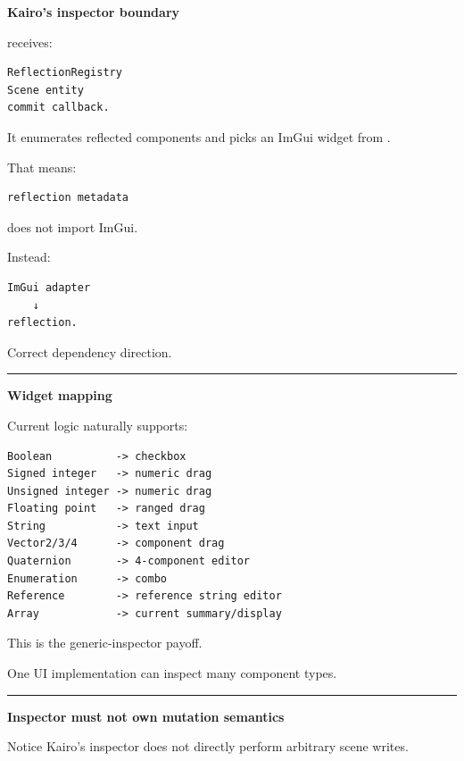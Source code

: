 \textbf{Kairo's inspector boundary}

 receives:

\begin{verbatim}
ReflectionRegistry
Scene entity
commit callback.
\end{verbatim}

It enumerates reflected components and picks an ImGui widget from .

That means:

\begin{verbatim}
reflection metadata
\end{verbatim}

does not import ImGui.

Instead:

\begin{verbatim}
ImGui adapter
    ↓
reflection.
\end{verbatim}

Correct dependency direction.

\begin{center}\rule{0.5\linewidth}{0.5pt}\end{center}

\textbf{Widget mapping}

Current logic naturally supports:

\begin{verbatim}
Boolean          -> checkbox
Signed integer   -> numeric drag
Unsigned integer -> numeric drag
Floating point   -> ranged drag
String           -> text input
Vector2/3/4      -> component drag
Quaternion       -> 4-component editor
Enumeration      -> combo
Reference        -> reference string editor
Array            -> current summary/display
\end{verbatim}

This is the generic-inspector payoff.

One UI implementation can inspect many component types.

\begin{center}\rule{0.5\linewidth}{0.5pt}\end{center}

\textbf{Inspector must not own mutation semantics}

Notice Kairo's inspector does not directly perform arbitrary scene writes.

